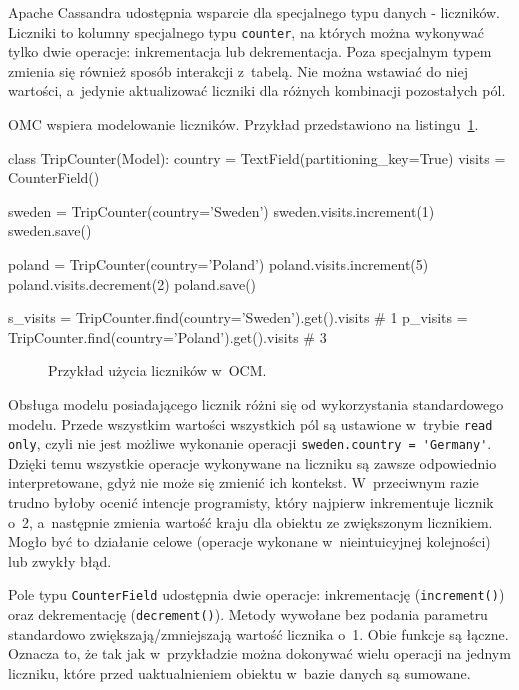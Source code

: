 Apache Cassandra udostępnia wsparcie dla specjalnego typu danych - liczników.~\cite{cassandra_counters} Liczniki to kolumny specjalnego typu \verb+counter+, na których można wykonywać tylko dwie operacje: inkrementacja lub dekrementacja. Poza specjalnym typem zmienia się również sposób interakcji z~tabelą. Nie można wstawiać do niej wartości, a~jedynie aktualizować liczniki dla różnych kombinacji pozostałych pól. 

OMC wspiera modelowanie liczników. Przykład przedstawiono na listingu~\ref{lst:ocm_counter_support}.

\begin{verbbox}
class TripCounter(Model):
    country = TextField(partitioning_key=True)
    visits = CounterField()

sweden = TripCounter(country='Sweden')
sweden.visits.increment(1)
sweden.save()

poland = TripCounter(country='Poland')
poland.visits.increment(5)
poland.visits.decrement(2)
poland.save()

s_visits = TripCounter.find(country='Sweden').get().visits    # 1
p_visits = TripCounter.find(country='Poland').get().visits    # 3
\end{verbbox}

\begin{figure}[ht!]
	\centering
	\theverbbox
	\caption{Przykład użycia liczników w~OCM.}
	\label{lst:ocm_counter_support}
\end{figure}

Obsługa modelu posiadającego licznik różni się od wykorzystania standardowego modelu. Przede wszystkim wartości wszystkich pól są ustawione w~trybie \verb+read only+, czyli nie jest możliwe wykonanie operacji \verb+sweden.country = 'Germany'+. Dzięki temu wszystkie operacje wykonywane na liczniku są zawsze odpowiednio interpretowane, gdyż nie może się zmienić ich kontekst. W~przeciwnym razie trudno byłoby ocenić intencje programisty, który najpierw inkrementuje licznik o~2, a~następnie zmienia wartość kraju dla obiektu ze zwiększonym licznikiem. Mogło być to działanie celowe (operacje wykonane w~nieintuicyjnej kolejności) lub zwykły błąd. 

Pole typu \verb+CounterField+ udostępnia dwie operacje: inkrementację (\verb+increment()+) oraz dekrementację (\verb+decrement()+). Metody wywołane bez podania parametru standardowo zwiększają/zmniejszają wartość licznika o~1. Obie funkcje są łączne. Oznacza to, że tak jak w~przykładzie można dokonywać wielu operacji na jednym liczniku, które przed uaktualnieniem obiektu w~bazie danych są sumowane.

